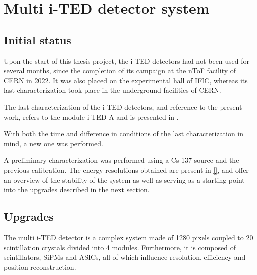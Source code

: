 \chapter{Multi i-TED detector system}\label{ch:multi-ited}

\section{Initial status}\label{sec:initial}

Upon the start of this thesis project, the \ac{i-TED} detectors had not been used for several months, since the completion of its campaign at the \ac{nToF} facility of \ac{CERN} in 2022. It was also placed on the experimental hall of \ac{IFIC}, whereas its last characterization took place in the underground facilities of \ac{CERN}.

The last characterization of the \ac{i-TED} detectors, and reference to the present work, refers to the module \ac{i-TED}-A and is presented in .

With both the time and difference in conditions of the last characterization in mind, a new one was performed.

A preliminary characterization was performed using a Cs-137 source and the previous calibration. The energy resolutions obtained are present in \ref{}, and offer an overview of the stability of the system as well as serving as a starting point into the upgrades described in the next section.

\section{Upgrades}\label{sec:upgrades}

The multi \ac{i-TED} detector is a complex system made of 1280 pixels coupled to 20 scintillation crystals divided into 4 modules. Furthermore, it is composed of scintillators, \ac{SiPM}s and \ac{ASIC}s, all of which influence resolution, efficiency and position reconstruction.

